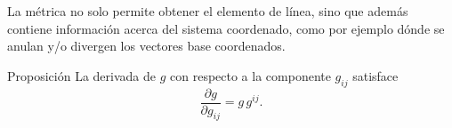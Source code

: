 \documentclass[../apunte_mecanica_clasica.tex]{subfiles}%
\begin{document}
La métrica no solo permite obtener el elemento de línea, 
sino que además contiene información acerca del sistema 
coordenado, como por ejemplo dónde se anulan y/o divergen 
los vectores base coordenados.  

\begin{apuntebloque}{Proposición}
La derivada de $g$ con respecto a la componente $g_{ij}$ satisface
\begin{equation*}
    \frac{\partial g}{\partial g_{ij}} = g \, g^{ij}.
\end{equation*}
\end{apuntebloque}

\newpage
\end{document}
